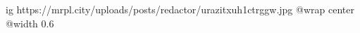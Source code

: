  
 
 
 
 

\ifcmt
  ig https://mrpl.city/uploads/posts/redactor/urazitxuh1ctrggw.jpg
  @wrap center
  @width 0.6
\fi
